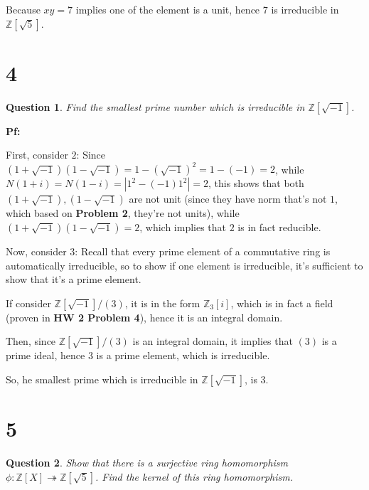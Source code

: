 \documentclass{article}
\newtheorem{question}{Question}
\begin{document}
Because $xy=7$ implies one of the element is a unit, hence $7$ is irreducible in $\mathbb{Z}[\sqrt{5}]$.

\break

\section*{4}      
\begin{myBox}[]{}
    \begin{question}
        Find the smallest prime number which is irreducible in $\mathbb{Z}[\sqrt{-1}]$.
    \end{question}
\end{myBox}

\textbf{Pf:}

First, consider $2$: Since $(1+\sqrt{-1})(1-\sqrt{-1})=1-(\sqrt{-1})^2 = 1-(-1)=2$, while $N(1+i)=N(1-i)=|1^2-(-1)1^2| = 2$, 
this shows that both $(1+\sqrt{-1}),(1-\sqrt{-1})$ are not unit (since they have norm that's not $1$, which based on \textbf{Problem 2},
they're not units), while $(1+\sqrt{-1})(1-\sqrt{-1})=2$, which implies that $2$ is in fact reducible.

\hfil

Now, consider $3$: Recall that every prime element of a commutative ring is automatically irreducible, so to show if one element is irreducible,
it's sufficient to show that it's a prime element.

If consider $\mathbb{Z}[\sqrt{-1}]/(3)$, it is in the form $\mathbb{Z}_3[i]$, which is in fact a field (proven in \textbf{HW 2 Problem 4}), 
hence it is an integral domain.

Then, since $\mathbb{Z}[\sqrt{-1}]/(3)$ is an integral domain, it implies that $(3)$ is a prime ideal, hence $3$ is a prime element, which is irreducible.

So, he smallest prime which is irreducible in $\mathbb{Z}[\sqrt{-1}]$, is $3$.

\hfil

\hfil

\section*{5}
\begin{myBox}[]{}
    \begin{question}
        Show that there is a surjective ring homomorphism $\phi:\mathbb{Z}[X]\twoheadrightarrow \mathbb{Z}[\sqrt{5}]$. Find the
kernel of this ring homomorphism.
    \end{question}
\end{myBox}
\end{document}
